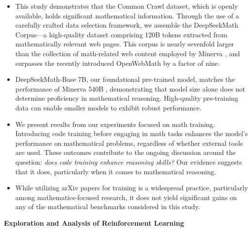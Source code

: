 \begin{itemize}[topsep=0pt]
    \item This study demonstrates that the Common Crawl dataset, which is openly available, holds significant mathematical information. Through the use of a carefully crafted data selection framework, we assemble the DeepSeekMath Corpus—a high-quality dataset comprising 120B tokens extracted from mathematically relevant web pages. This corpus is nearly sevenfold larger than the collection of math-related web content employed by Minerva \citep{minerva}, and surpasses the recently introduced OpenWebMath \citep{openwebmath} by a factor of nine.

\item DeepSeekMath-Base 7B, our foundational pre-trained model, matches the performance of Minerva 540B \citep{minerva}, demonstrating that model size alone does not determine proficiency in mathematical reasoning. High-quality pre-training data can enable smaller models to exhibit robust performance.

\item We present results from our experiments focused on math training. Introducing code training before engaging in math tasks enhances the model's performance on mathematical problems, regardless of whether external tools are used. These outcomes contribute to the ongoing discussion around the question: \textit{does code training enhance reasoning skills?} Our evidence suggests that it does, particularly when it comes to mathematical reasoning.

\item While utilizing arXiv papers for training is a widespread practice, particularly among mathematics-focused research, it does not yield significant gains on any of the mathematical benchmarks considered in this study.
\end{itemize}

\textbf{Exploration and Analysis of Reinforcement Learning}

